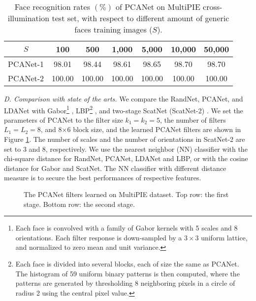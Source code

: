 \documentclass[10pt,journal,compsoc]{IEEEtran}
\begin{document}
\begin{table}\centering
\caption{Face recognition rates $(\%)$ of PCANet on MultiPIE cross-illumination test set, with respect to different amount of generic faces training images ($S$). }
\vspace{0.1cm}\begin{tabular}{c|c|c|c|c|c|c}
  \hline
$S$ & 100 & 500 & 1,000 & 5,000 & 10,000 & 50,000  \\ \hline \hline
  PCANet-1   & 98.01 & 98.44 & 98.61 & 98.65 & 98.70 & 98.70  \\
  PCANet-2   & 100.00 & 100.00 & 100.00 & 100.00 & 100.00 & 100.00 \\
  \hline
\end{tabular}\label{table: MultiPIE_generic_training}
\end{table}



\vspace{0.3\baselineskip}
{\em D. Comparison with state of the arts.} We compare the RandNet, PCANet, and LDANet with Gabor\footnote{Each face is convolved with a family of Gabor kernels with 5 scales and 8 orientations. Each filter response is down-sampled by a $3\times 3$ uniform lattice, and normalized to zero mean and unit variance.} \cite{Liu2002}, LBP\footnote{Each face is divided into several blocks, each of size the same as PCANet. The histogram of 59 uniform binary patterns is then computed, where the patterns are generated by thresholding 8 neighboring pixels in a circle of radius 2 using the central pixel value.} \cite{Ahonen2006}, and two-stage ScatNet (ScatNet-2) \cite{Bruna2013}. We set the parameters of PCANet to the filter size $k_1 = k_2 = 5$, the number of filters $L_1 = L_2 = 8$, and 8$\times$6 block size, and the learned PCANet filters are shown in Figure \ref{fig: MultiPIE_filters}. The number of scales and the number of orientations in ScatNet-2 are set to 3 and 8, respectively. We use the nearest neighbor (NN) classifier with the chi-square distance for RandNet, PCANet, LDANet and LBP, or with the cosine distance for Gabor and ScatNet. The NN classifier with different distance measure is to secure the best performances of respective features.


\begin{figure}[t]
\centering
{}
\caption{The PCANet filters learned on MultiPIE dataset. Top row: the first stage. Bottom row: the second stage.} \label{fig: MultiPIE_filters}
\end{figure}
\end{document}
